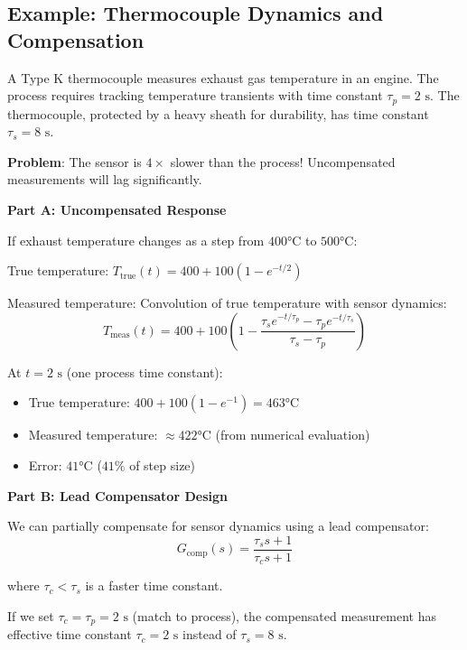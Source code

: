 \subsection{Example: Thermocouple Dynamics and Compensation}
\label{ex:thermocouple_compensation}

\begin{example}

A Type K thermocouple measures exhaust gas temperature in an engine. The process requires tracking temperature transients with time constant $\tau_p = 2\text{ s}$. The thermocouple, protected by a heavy sheath for durability, has time constant $\tau_s = 8\text{ s}$.

\textbf{Problem}: The sensor is $4\times$ slower than the process! Uncompensated measurements will lag significantly.

\textbf{Part A: Uncompensated Response}

If exhaust temperature changes as a step from $400°\text{C}$ to $500°\text{C}$:

True temperature: $T_{\text{true}}(t) = 400 + 100(1 - e^{-t/2})$

Measured temperature: Convolution of true temperature with sensor dynamics:
\begin{equation}
T_{\text{meas}}(t) = 400 + 100\left(1 - \frac{\tau_s e^{-t/\tau_p} - \tau_p e^{-t/\tau_s}}{\tau_s - \tau_p}\right)
\end{equation}

At $t = 2\text{ s}$ (one process time constant):
\begin{itemize}
    \item True temperature: $400 + 100(1 - e^{-1}) = 463°\text{C}$
    \item Measured temperature: $\approx 422°\text{C}$ (from numerical evaluation)
    \item Error: $41°\text{C}$ ($41\%$ of step size)
\end{itemize}

\textbf{Part B: Lead Compensator Design}

We can partially compensate for sensor dynamics using a lead compensator:
\begin{equation}
G_{\text{comp}}(s) = \frac{\tau_s s + 1}{\tau_c s + 1}
\label{eq:lead_comp}
\end{equation}

where $\tau_c < \tau_s$ is a faster time constant.

If we set $\tau_c = \tau_p = 2\text{ s}$ (match to process), the compensated measurement has effective time constant $\tau_c = 2\text{ s}$ instead of $\tau_s = 8\text{ s}$.


\end{example}
